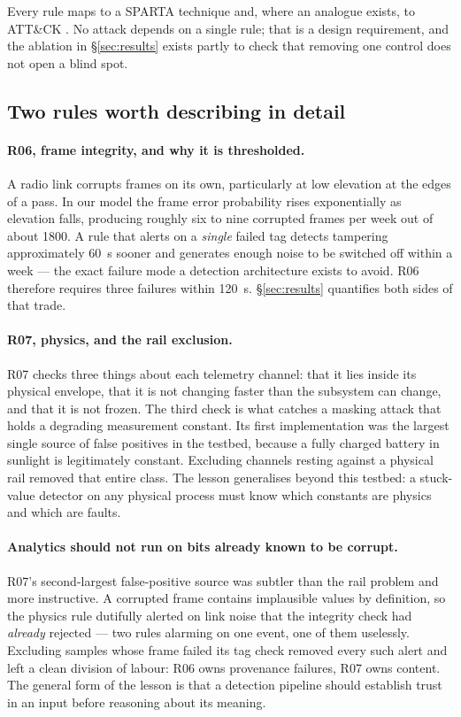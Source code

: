 Every rule maps to a SPARTA technique \cite{sparta} and, where an analogue
exists, to ATT\&CK \cite{attack}. No attack depends on a single rule; that is a
design requirement, and the ablation in \S\ref{sec:results} exists partly to
check that removing one control does not open a blind spot.

\subsection{Two rules worth describing in detail}

\paragraph{R06, frame integrity, and why it is thresholded.}
A radio link corrupts frames on its own, particularly at low elevation at the
edges of a pass. In our model the frame error probability rises exponentially as
elevation falls, producing roughly six to nine corrupted frames per week out of
about \num{1800}. A rule that alerts on a \emph{single} failed tag detects
tampering approximately \SI{60}{\second} sooner and generates enough noise to be
switched off within a week --- the exact failure mode a detection architecture
exists to avoid. R06 therefore requires three failures within
\SI{120}{\second}. \S\ref{sec:results} quantifies both sides of that trade.

\paragraph{R07, physics, and the rail exclusion.}
R07 checks three things about each telemetry channel: that it lies inside its
physical envelope, that it is not changing faster than the subsystem can change,
and that it is not frozen. The third check is what catches a masking attack that
holds a degrading measurement constant. Its first implementation was the largest
single source of false positives in the testbed, because a fully charged battery
in sunlight is legitimately constant. Excluding channels resting against a
physical rail removed that entire class. The lesson generalises beyond this
testbed: a stuck-value detector on any physical process must know which constants
are physics and which are faults.

\paragraph{Analytics should not run on bits already known to be corrupt.}
R07's second-largest false-positive source was subtler than the rail problem and
more instructive. A corrupted frame contains implausible values by definition, so
the physics rule dutifully alerted on link noise that the integrity check had
\emph{already} rejected --- two rules alarming on one event, one of them
uselessly. Excluding samples whose frame failed its tag check removed every such
alert and left a clean division of labour: R06 owns provenance failures, R07 owns
content. The general form of the lesson is that a detection pipeline should
establish trust in an input before reasoning about its meaning.

